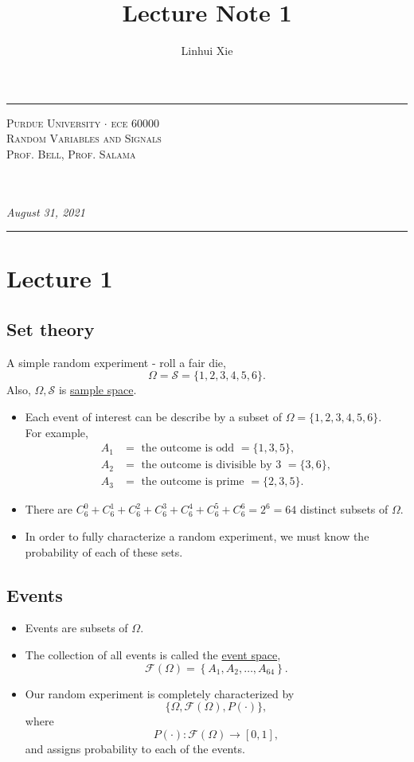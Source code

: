 \documentclass[12pt,thmsa]{article}
\author{Linhui Xie}
\title{Lecture Note 1}
\makeatletter
\def\maketitle{%
	\par
	\hrule height 1.5pt\vspace{1ex}
	\par\noindent
	
	\begin{minipage}{0.5\textwidth}
		\scshape
		Purdue University $\cdot$ ece 60000 \\[1ex]
		Random Variables and Signals \\
		Prof. Bell, Prof. Salama
	\end{minipage}
	\begin{minipage}{0.45\textwidth}
		\raggedleft
		\MakeTextUppercase{{\@title}}\\[0.3ex] %
		\textit{\@author}\\[0.2ex]
		\textit{August 31, 2021}
	\end{minipage}
	\par\vspace{1ex}
	\hrule height 1.5pt\vspace{1ex}
	\par
}
\makeatother
\begin{document}
\maketitle

\section{Lecture 1\medskip}

\subsection{Set theory} %
A simple random experiment - roll a fair die,
\[\Omega=\mathcal{S}=\{1,2,3,4,5,6\}.\]
Also, \(\Omega, \mathcal{S}\) is \underline{sample space}.
\begin{itemize}
	\item Each event of interest can be describe by a subset of \(\Omega=\{1,2,3,4,5,6\}\).\\
    For example, \\
	\[\begin{aligned}
	A_{1} &= \text{ the outcome is odd } = \{1, 3, 5\}, \\
	A_{2} &= \text{ the outcome is divisible by 3 } = \{3, 6\}, \\
	A_{3} &= \text{ the outcome is prime } = \{2, 3, 5\}.
	\end{aligned}\]
	\item There are \(C_{6}^{0} + C_{6}^{1} + C_{6}^{2} + C_{6}^{3} + C_{6}^{4} + C_{6}^{5} + C_{6}^{6}=2^6=64\) distinct subsets of \(\Omega\).
	\item In order to fully characterize a random experiment, we must know the probability of each of these sets.
\end{itemize}

\subsection{Events} %
\begin{itemize}
	\item Events are subsets of \(\Omega\).
	\item The collection of all events is called the \underline{event space},
\[\mathcal{F}(\Omega)=\left\{A_{1}, {A}_{2}, \ldots, A_{64}\right\}.\]
	\item Our random experiment is completely characterized by
\[
\{\Omega, \mathcal{F}(\Omega), P(\cdot)\},
\]where\[
P(\cdot): \mathcal{F}(\Omega) \rightarrow[0,1],
\] and assigns probability to each of the events.
\end{itemize}
\end{document}

